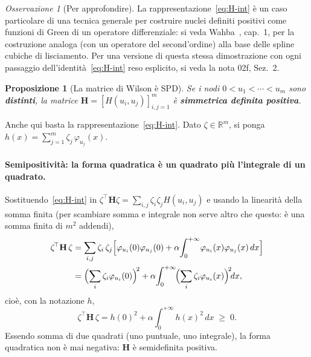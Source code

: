 \documentclass[11pt,a4paper]{article}
\theoremstyle{plain}
\newtheorem{proposizione}[teorema]{Proposizione}
\theoremstyle{definition}
\theoremstyle{remark}
\newtheorem*{osservazione}{Osservazione}
\newcommand{\Hmat}{\mathbf{H}}
\newcommand{\transp}{^{\!\top}}
\begin{document}
\begin{osservazione}[Per approfondire]
La rappresentazione~\eqref{eq:H-int} \`e un caso particolare di una tecnica generale per
costruire nuclei definiti positivi come funzioni di Green di un operatore differenziale: si
veda Wahba~\cite{wahba1990}, cap.~1, per la costruzione analoga (con un operatore del
second'ordine) alla base delle spline cubiche di lisciamento. Per una versione di questa
stessa dimostrazione con ogni passaggio dell'identit\`a~\eqref{eq:H-int} reso esplicito, si
veda la nota 02f, Sez.~2.
\end{osservazione}

\begin{proposizione}[La matrice di Wilson \`e SPD]
\label{prop:H-spd}
Se i nodi $0<u_1<\cdots<u_m$ sono \textbf{distinti}, la matrice
$\Hmat=[H(u_i,u_j)]_{i,j=1}^m$ \`e \textbf{simmetrica definita positiva}.
\end{proposizione}

Anche qui basta la rappresentazione~\eqref{eq:H-int}. Dato $\zeta\in\mathbb{R}^m$, si ponga
$h(x) = \sum_{j=1}^m \zeta_j\,\varphi_{u_j}(x)$.

\paragraph{Semipositivit\`a: la forma quadratica \`e un quadrato pi\`u l'integrale di un
quadrato.} Sostituendo~\eqref{eq:H-int} in $\zeta\transp\Hmat\zeta=\sum_{i,j}\zeta_i\zeta_j
H(u_i,u_j)$ e usando la linearit\`a della somma finita (per scambiare somma e integrale non
serve altro che questo: \`e una somma finita di $m^2$ addendi),
\begin{align*}
  \zeta\transp\Hmat\,\zeta
  &= \sum_{i,j}\zeta_i\,\zeta_j\Bigl[\varphi_{u_i}(0)\varphi_{u_j}(0)
    + \alpha\!\int_0^{+\infty}\!\varphi_{u_i}(x)\varphi_{u_j}(x)\,dx\Bigr]\\
  &= \Bigl(\sum_i \zeta_i\varphi_{u_i}(0)\Bigr)^{\!2}
    + \alpha\!\int_0^{+\infty}\!\Bigl(\sum_i \zeta_i\varphi_{u_i}(x)\Bigr)^{\!2}\!dx ,
\end{align*}
cio\`e, con la notazione $h$,
\begin{equation}
  \zeta\transp\Hmat\,\zeta
  = h(0)^2 + \alpha\!\int_0^{+\infty}\! h(x)^2\,dx \;\ge\; 0 .
  \label{eq:energia-int}
\end{equation}
Essendo somma di due quadrati (uno puntuale, uno integrale), la forma quadratica non \`e mai
negativa: $\Hmat$ \`e semidefinita positiva.
\end{document}
